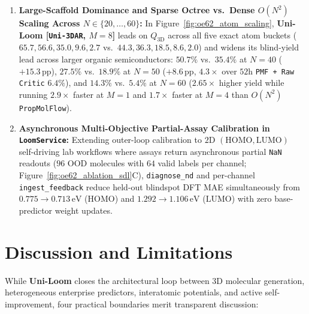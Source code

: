 \documentclass[11pt,a4paper]{article}
\begin{document}
\begin{enumerate}[leftmargin=1.5em,itemsep=2pt,topsep=2pt]
    \item \textbf{Large-Scaffold Dominance and Sparse Octree vs.\ Dense $O(N^2)$ Scaling Across $N\in\{20,\dots,60\}$:} In Figure~\ref{fig:oe62_atom_scaling}, \textbf{Uni-Loom [\texttt{Uni-\allowbreak 3DAR}, $M=8$]} leads on $Q_{\text{3D}}$ across all five exact atom buckets ($65.7, 56.6, 35.0, 9.6, 2.7$ vs.\ $44.3, 36.3, 18.5, 8.6, 2.0$) and widens its blind-yield lead across larger organic semiconductors: $50.7\%$ vs.\ $35.4\%$ at $N=40$ ($+15.3\,\text{pp}$), $27.5\%$ vs.\ $18.9\%$ at $N=50$ ($+8.6\,\text{pp}$, $4.3\times$ over $52\text{h}$ \texttt{PMF + Raw Critic} $6.4\%$), and $14.3\%$ vs.\ $5.4\%$ at $N=60$ ($2.65\times$ higher yield while running $2.9\times$ faster at $M=1$ and $1.7\times$ faster at $M=4$ than $O(N^2)$ \texttt{Prop\allowbreak MolFlow}).
    \item \textbf{Asynchronous Multi-Objective Partial-Assay Calibration in \texttt{Loom\allowbreak Service}:} Extending outer-loop calibration to $2\text{D}$ $(\text{HOMO},\text{LUMO})$ self-driving lab workflows where assays return asynchronous partial \texttt{NaN} readouts ($96$ OOD molecules with $64$ valid labels per channel; Figure~\ref{fig:oe62_ablation_sdl}C), \texttt{diagnose\_\allowbreak nd} and per-channel \texttt{ingest\_\allowbreak feedback} reduce held-out blindspot DFT MAE simultaneously from $0.775 \to 0.713\,\text{eV}$ ($\text{HOMO}$) and $1.292 \to 1.106\,\text{eV}$ ($\text{LUMO}$) with zero base-predictor weight updates.
\end{enumerate}

\section{Discussion and Limitations}
\label{sec:limitations}

While \textbf{Uni-Loom} closes the architectural loop between 3D molecular generation, heterogeneous enterprise predictors, interatomic potentials, and active self-improvement, four practical boundaries merit transparent discussion:
\end{document}
